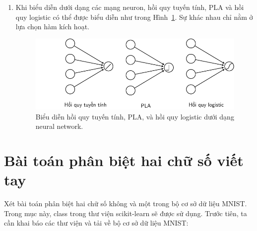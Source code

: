 \begin{enumerate}
Hàm dự đoán đầu ra của các điểm dữ liệu mới có thể được viết như sau:
\begin{lstlisting}[language=Python]
def predict(w, X, threshold = 0.5):
"""
predict output for each row of X
X: a numpy array of shape (N, d), threshold: 0 < threshold < 1
return a 1d numpy array, each element is 0 or 1
"""
res = np.zeros(X.shape[0])
res[np.where(prob(w, X) > threshold)[0]] = 1
return res
\end{lstlisting}
Trong các ví dụ đã nêu, ngưỡng ra quyết định đều được lấy tại 0.5. Trong
nhiều trường hợp, ngưỡng này có thể được thay đổi. Ví dụ, việc xác định các
giao dịch là lừa đảo của một công ty tín dụng là rất quan trọng. Việc phân
loại nhầm một giao dịch lừa đảo thành một giao dịch thông thường gây ra hậu
quả nghiêm trọng hơn chiều ngược lại. Trong bài toán đó, ngưỡng phân loại có
thể giảm xuống còn 0.3. Nghĩa là các giao dịch được dự đoán là lừa đảo với
xác suất lớn hơn 0.3 sẽ được gán nhãn lừa đảo và cần được xử lý bằng các biện pháp khác.



\item Khi biểu diễn dưới dạng các mạng neuron, hồi quy tuyến tính, PLA và
hồi quy logistic có thể được biểu diễn như trong Hình~\ref{fig:10_8}. Sự
khác nhau chỉ nằm ở lựa chọn hàm kích hoạt.
\begin{figure}[t]
\centering
\includegraphics[width = .9\textwidth]{Chapters/05_NeuralNetworks/10_logisticregression/latex/3models.pdf}
\caption[]{Biểu diễn hồi quy tuyến tính, PLA, và hồi quy logistic
dưới dạng neural network.}
\label{fig:10_8}
\end{figure}

\end{enumerate}










\section{Bài toán phân biệt hai chữ số viết tay }
Xét bài toán phân biệt hai chữ số không và một trong bộ cơ sở dữ liệu MNIST.
Trong mục này, class  trong thư viện
scikit-learn sẽ được sử dụng. Trước tiên, ta cần khai báo các thư viện và tải về
bộ cơ sở dữ liệu MNIST:


